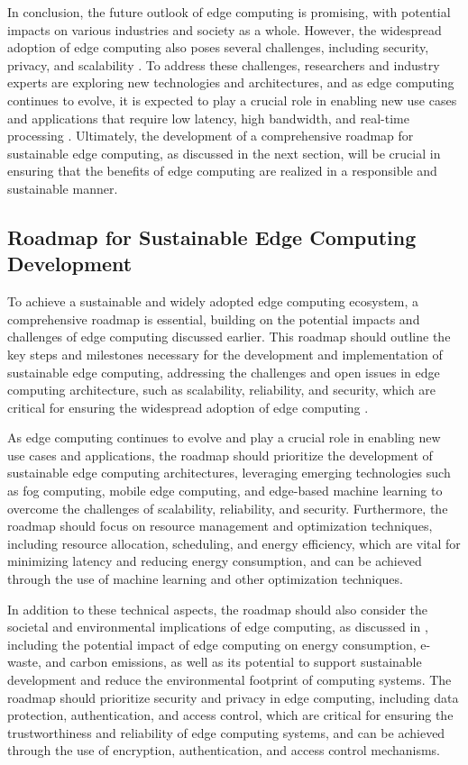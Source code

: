 \documentclass[11pt]{article}
\begin{document}
In conclusion, the future outlook of edge computing is promising, with potential impacts on various industries and society as a whole. However, the widespread adoption of edge computing also poses several challenges, including security, privacy, and scalability \cite{ref218}. To address these challenges, researchers and industry experts are exploring new technologies and architectures, and as edge computing continues to evolve, it is expected to play a crucial role in enabling new use cases and applications that require low latency, high bandwidth, and real-time processing \cite{ref24}. Ultimately, the development of a comprehensive roadmap for sustainable edge computing, as discussed in the next section, will be crucial in ensuring that the benefits of edge computing are realized in a responsible and sustainable manner.

\subsection{Roadmap for Sustainable Edge Computing Development}

To achieve a sustainable and widely adopted edge computing ecosystem, a comprehensive roadmap is essential, building on the potential impacts and challenges of edge computing discussed earlier. This roadmap should outline the key steps and milestones necessary for the development and implementation of sustainable edge computing, addressing the challenges and open issues in edge computing architecture, such as scalability, reliability, and security, which are critical for ensuring the widespread adoption of edge computing \cite{ref1}.

As edge computing continues to evolve and play a crucial role in enabling new use cases and applications, the roadmap should prioritize the development of sustainable edge computing architectures, leveraging emerging technologies such as fog computing, mobile edge computing, and edge-based machine learning to overcome the challenges of scalability, reliability, and security. Furthermore, the roadmap should focus on resource management and optimization techniques, including resource allocation, scheduling, and energy efficiency, which are vital for minimizing latency and reducing energy consumption, and can be achieved through the use of machine learning and other optimization techniques.

In addition to these technical aspects, the roadmap should also consider the societal and environmental implications of edge computing, as discussed in \cite{ref203}, including the potential impact of edge computing on energy consumption, e-waste, and carbon emissions, as well as its potential to support sustainable development and reduce the environmental footprint of computing systems. The roadmap should prioritize security and privacy in edge computing, including data protection, authentication, and access control, which are critical for ensuring the trustworthiness and reliability of edge computing systems, and can be achieved through the use of encryption, authentication, and access control mechanisms.
\end{document}
